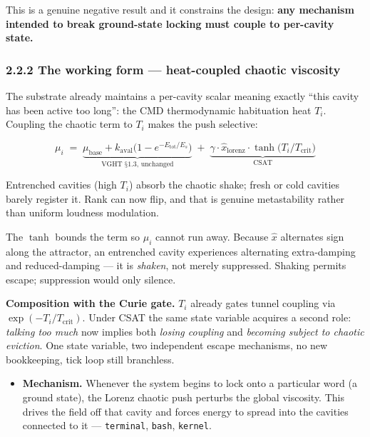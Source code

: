 \documentclass[
  11pt,
  a4paper,
]{article}
\providecommand{\tightlist}{%
  \setlength{\itemsep}{0pt}\setlength{\parskip}{0pt}}
\begin{document}
This is a genuine negative result and it constrains the design:
\textbf{any mechanism intended to break ground-state locking must couple
to per-cavity state.}

\subsubsection{2.2.2 The working form --- heat-coupled chaotic
viscosity}\label{the-working-form-heat-coupled-chaotic-viscosity}

The substrate already maintains a per-cavity scalar meaning exactly
``this cavity has been active too long'': the CMD thermodynamic
habituation heat \(T_i\). Coupling the chaotic term to \(T_i\) makes the
push selective:

\[ \mu_i \;=\; \underbrace{\mu_{\text{base}} + k_{\text{aval}}\bigl(1 - e^{-E_{\text{tot}}/E_s}\bigr)}_{\text{VGHT §1.3, unchanged}} \;+\; \underbrace{\gamma \cdot \hat{x}_{\text{lorenz}} \cdot \tanh\!\bigl(T_i / T_{\text{crit}}\bigr)}_{\text{CSAT}} \]

Entrenched cavities (high \(T_i\)) absorb the chaotic shake; fresh or
cold cavities barely register it. Rank can now flip, and that is genuine
metastability rather than uniform loudness modulation.

The \(\tanh\) bounds the term so \(\mu_i\) cannot run away. Because
\(\hat{x}\) alternates sign along the attractor, an entrenched cavity
experiences alternating extra-damping and reduced-damping --- it is
\emph{shaken}, not merely suppressed. Shaking permits escape;
suppression would only silence.

\textbf{Composition with the Curie gate.} \(T_i\) already gates tunnel
coupling via \(\exp(-T_i/T_{\text{crit}})\). Under CSAT the same state
variable acquires a second role: \emph{talking too much} now implies
both \emph{losing coupling} and \emph{becoming subject to chaotic
eviction}. One state variable, two independent escape mechanisms, no new
bookkeeping, tick loop still branchless.

\begin{itemize}
\tightlist
\item
  \textbf{Mechanism.} Whenever the system begins to lock onto a
  particular word (a ground state), the Lorenz chaotic push perturbs the
  global viscosity. This drives the field off that cavity and forces
  energy to spread into the cavities connected to it ---
  \texttt{terminal}, \texttt{bash}, \texttt{kernel}.
\end{itemize}
\end{document}
